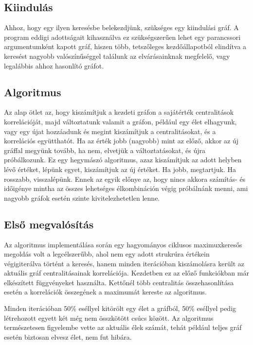 \documentclass[12pt,numbers=noenddot]{report}
\begin{document}
\subsection{Kiindulás}
Ahhoz, hogy egy ilyen keresésbe belekezdjünk, szükséges egy kiindulási gráf.
A program eddigi adottságait kihasználva ez szükségszerűen lehet egy parancssori
argumentumként kapott gráf, hiszen több, tetszőleges kezdőállapotból elindítva a 
keresést nagyobb valószínűséggel találunk az elvárásainknak megfelelő, vagy 
legalábbis ahhoz hasonlító gráfot.

\subsection{Algoritmus}
Az alap ötlet az, hogy kiszámítjuk a kezdeti gráfon a sajátérték centralitások
korrelációját, majd változtatunk valamit a gráfon, például egy élet elhagyunk,
vagy egy újat hozzáadunk és megint kiszámítjuk a centralitásokat, és a 
korrelációs együtthatót. Ha az érték jobb (nagyobb) mint az előző, akkor 
az új gráffal megyünk tovább, ha nem, elvetjük a változtatásokat, és újra 
próbálkozunk. 
Ez egy hegymászó algoritmus, azaz kiszámítjuk az adott helyben lévő értéket,
lépünk egyet, kiszámítjuk az új értéket. Ha jobb, megtartjuk. Ha rosszabb,
visszalépünk. Ennek az egyik előnye az, hogy nincs akkora számítás- és időigénye
mintha az összes lehetséges élkombináción végig próbálnánk menni, ami nagyobb 
gráfok esetén szinte kivitelezhetetlen lenne.

\pagebreak

\subsection{Első megvalósítás}
Az algoritmus implementálása során egy hagyományos ciklusos maximuxkeresős 
megoldás volt a legcélszerűbb, ahol nem egy adott strukrúra értékein
végigiterálva történt a keresés, hanem minden iterációban kiszámolásra került
az aktuális gráf centralitásainak korrelációja. Kezdetben ez az előző 
funkciókban már elkészített függvényeket használta. Kettőnél több centralitás
összehasonlítása esetén a korrelációk összegének a maximumát kereste az 
algoritmus.

Minden iterációban 50\% eséllyel kitörölt egy élet a gráfból, 50\% eséllyel 
pedig létrehozott egyett két még nem összkötött csúcs között. Az algoritmus 
természetesen figyelembe vette az aktuális élek számát, tehát például teljes 
gráf esetén biztosan elvesz élet, nem fut hibára.
\end{document}

